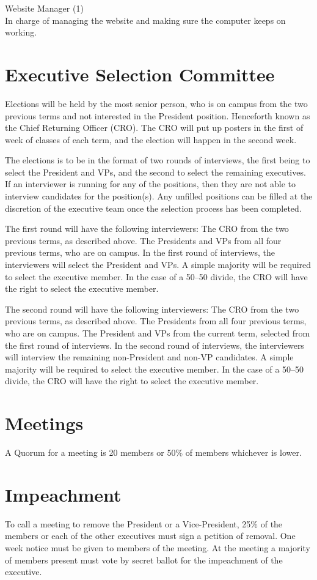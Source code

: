 \documentclass[11pt]{mathsoc}
\begin{document}
Website Manager (1)\\
In charge of managing the website and making sure the computer keeps on working.

\section{Executive Selection Committee}
Elections will be held by the most senior person, who is on campus from the two
previous terms and not interested in the President position. Henceforth known 
as the Chief Returning Officer (CRO). The CRO will put up posters in the first 
of week of classes of each term, and the election will happen in the second week. 

The elections is to be in the format of two rounds of interviews, the first 
being to select the President and VPs, and the second to select the remaining
executives. If an interviewer is running for any of the positions, then they
are not able to interview candidates for the position(s). Any unfilled 
positions can be filled at the discretion of the executive team once the 
selection process has been completed.

The first round will have the following interviewers: 
The CRO from the two previous terms, as described above.
The Presidents and VPs from all four previous terms, who are on campus.
In the first round of interviews, the interviewers will select the President and 
VPs. A simple majority will be required to select the executive member. 
In the case of a 50--50 divide, the CRO will have the right to select the 
executive member.

The second round will have the following interviewers: 
The CRO from the two previous terms, as described above.
The Presidents from all four previous terms, who are on campus.
The President and VPs from the current term, selected from the first
round of interviews.
In the second round of interviews, the interviewers will interview the 
remaining non-President and non-VP candidates. A simple majority will 
be required to select the executive member. In the case of a 50--50 divide, the
CRO will have the right to select the executive member.

\section{Meetings}
A Quorum for a meeting is 20 members or 50\% of members whichever is lower.

\section{Impeachment}
To call a meeting to remove the President or a Vice-President, 25\% of the 
members or each of the other executives must sign a petition of removal. 
One week notice must be given to members of the meeting. At the meeting a 
majority of members present must vote by secret ballot for the impeachment 
of the executive.
\end{document}
